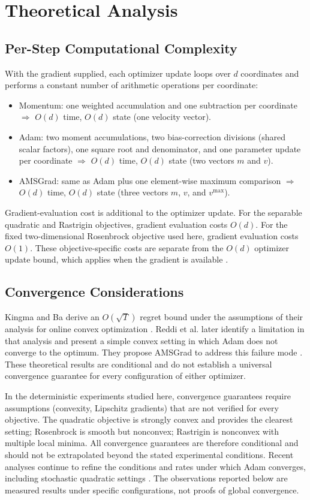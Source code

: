 ﻿\documentclass[conference]{IEEEtran}
\begin{document}
\section{Theoretical Analysis}

\subsection{Per-Step Computational Complexity}
With the gradient supplied, each optimizer update loops over $d$ coordinates and performs a constant number of arithmetic operations per coordinate:
\begin{itemize}
  \item Momentum: one weighted accumulation and one subtraction per coordinate $\Rightarrow$ $O(d)$ time, $O(d)$ state (one velocity vector).
  \item Adam: two moment accumulations, two bias-correction divisions (shared scalar factors), one square root and denominator, and one parameter update per coordinate $\Rightarrow$ $O(d)$ time, $O(d)$ state (two vectors $m$ and $v$).
  \item AMSGrad: same as Adam plus one element-wise maximum comparison $\Rightarrow$ $O(d)$ time, $O(d)$ state (three vectors $m$, $v$, and $v^{\max}$).
\end{itemize}
Gradient-evaluation cost is additional to the optimizer update. For the separable quadratic and Rastrigin objectives, gradient evaluation costs $O(d)$. For the fixed two-dimensional Rosenbrock objective used here, gradient evaluation costs $O(1)$. These objective-specific costs are separate from the $O(d)$ optimizer update bound, which applies when the gradient is available \cite{nocedal}.

\subsection{Convergence Considerations}
Kingma and Ba derive an $O(\sqrt{T})$ regret bound under the assumptions of their analysis for online convex optimization \cite{kingma}. Reddi et al. later identify a limitation in that analysis and present a simple convex setting in which Adam does not converge to the optimum. They propose AMSGrad to address this failure mode \cite{reddi}. These theoretical results are conditional and do not establish a universal convergence guarantee for every configuration of either optimizer.

In the deterministic experiments studied here, convergence guarantees require assumptions (convexity, Lipschitz gradients) that are not verified for every objective. The quadratic objective is strongly convex and provides the clearest setting; Rosenbrock is smooth but nonconvex; Rastrigin is nonconvex with multiple local minima. All convergence guarantees are therefore conditional and should not be extrapolated beyond the stated experimental conditions. Recent analyses continue to refine the conditions and rates under which Adam converges, including stochastic quadratic settings \cite{dereich}. The observations reported below are measured results under specific configurations, not proofs of global convergence.
\end{document}
